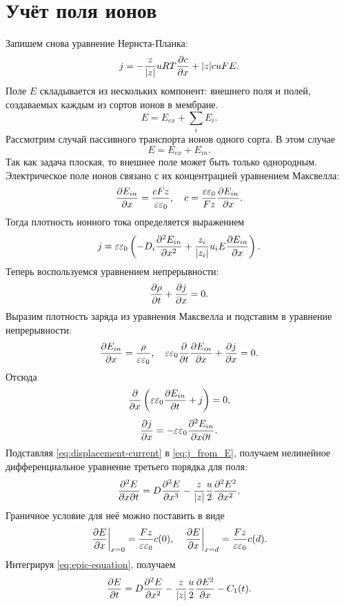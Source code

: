 \section{Учёт поля ионов}
    Запишем снова уравнение Нернста-Планка:
    \[
        j = -\frac{z}{|z|}uRT\frac{\partial c}{\partial x} + |z|cuFE.
    \]
    Поле \( E \) складывается из нескольких компонент: внешнего поля и полей,
    создаваемых каждым из сортов ионов в мембране.
    \[
        E = E_{ex} + \sum_{i} E_i.
    \]
    Рассмотрим случай пассивного транспорта ионов одного сорта. В этом случае
    \[
        E = E_{ex} + E_{in}.
    \]
    Так как задача плоская, то внешнее поле может быть только однородным.
    Электрическое поле ионов связано с их концентрацией уравнением Максвелла:
    \[
        \frac{\partial E_{in}}{\partial x} = \frac{cFz}{\varepsilon\varepsilon_0},\quad
        c = \frac{\varepsilon\varepsilon_0}{Fz}\frac{\partial E_{in}}{\partial x}.
    \]
    Тогда плотность ионного тока определяется выражением
    \begin{equation}
        j = \varepsilon\varepsilon_0
            \left(-D_i\frac{\partial^2 E_{in}}{\partial {x}^2}+
            \frac{z_i}{|z_i|}u_iE\frac{\partial E_{in}}{\partial x}\right).
        \label{eq:j_from_E}
    \end{equation}
    Теперь воспользуемся уравнением непрерывности:
    \[
        \frac{\partial \rho}{\partial t} + \frac{\partial j}{\partial x} = 0.
    \]
    Выразим плотность заряда из уравнения Максвелла и подставим в уравнение
    непрерывности:
    \[
        \frac{\partial E_{in}}{\partial x} = \frac{\rho}{\varepsilon\varepsilon_0},\quad
        \varepsilon\varepsilon_0\frac{\partial }{\partial t}\frac{\partial E_{in}}{\partial x} + \frac{\partial j}{\partial x} = 0.
    \]
    Отсюда
    \[
        \frac{\partial }{\partial x}\left(\varepsilon\varepsilon_0\frac{\partial E_{in}}{\partial t} + j\right) = 0,
    \]
    \begin{equation}
        \frac{\partial j}{\partial x} = -\varepsilon\varepsilon_0\frac{\partial^2 E_{in}}{\partial x \partial t}.
        \label{eq:displacement-current}
    \end{equation}
    Подставляя \eqref{eq:displacement-current} в \eqref{eq:j_from_E}, получаем
    нелинейное дифференциальное уравнение третьего порядка для поля:
    \begin{equation}
        \frac{\partial^2 E}{\partial x \partial t} = D\frac{\partial^3{E}}{\partial x^3} -
        \frac{z}{\left| z \right|}\frac{u}{2}\frac{\partial^2 E^2}{\partial {x}^2}.
        \label{eq:epic-equation}
    \end{equation}
    Граничное условие для неё можно поставить в виде
    \[
        \left.\frac{\partial E}{\partial x}\right|_{x=0} = \frac{Fz}{\varepsilon\varepsilon_0}c(0),\quad
        \left.\frac{\partial E}{\partial x}\right|_{x=d} = \frac{Fz}{\varepsilon\varepsilon_0}c(d).
    \]
    Интегрируя \eqref{eq:epic-equation}, получаем
    \begin{equation}
        \frac{\partial E}{\partial t} = D\frac{\partial^2 E}{\partial {x}^2} -
        \frac{z}{\left| z \right|}\frac{u}{2}\frac{\partial E^2}{\partial x} - C_1(t).
        \label{eq:epic-integrated}
    \end{equation}
